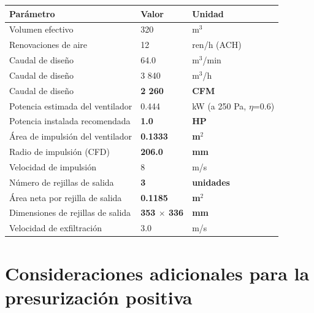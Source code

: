 \documentclass[12pt,a4paper]{article}
\begin{document}
\begin{table}[h!]
\centering
{}
\begin{tabular}{@{}p{6.5cm}p{3cm}p{4.5cm}@{}}
\toprule
\textbf{Parámetro} & \textbf{Valor} & \textbf{Unidad} \\
\midrule
Volumen efectivo & 320 & m$^3$ \\
Renovaciones de aire & 12 & ren/h (ACH) \\
Caudal de diseño & 64.0 & m$^3$/min \\
Caudal de diseño & 3 840 & m$^3$/h \\
Caudal de diseño & \textbf{2 260} & \textbf{CFM} \\
Potencia estimada del ventilador & 0.444 & kW (a 250 Pa, $\eta$=0.6) \\
Potencia instalada recomendada & \textbf{1.0} & \textbf{HP} \\
Área de impulsión del ventilador & \textbf{0.1333} & \textbf{m$^2$} \\
Radio de impulsión (CFD) & \textbf{206.0} & \textbf{mm} \\
Velocidad de impulsión & 8 & m/s \\
Número de rejillas de salida & \textbf{3} & \textbf{unidades} \\
Área neta por rejilla de salida & \textbf{0.1185} & \textbf{m$^2$} \\
Dimensiones de rejillas de salida & \textbf{353 $\times$ 336} & \textbf{mm} \\
Velocidad de exfiltración & 3.0 & m/s \\
\bottomrule
\end{tabular}
\end{table}

\section{Consideraciones adicionales para la presurización positiva}
\end{document}
